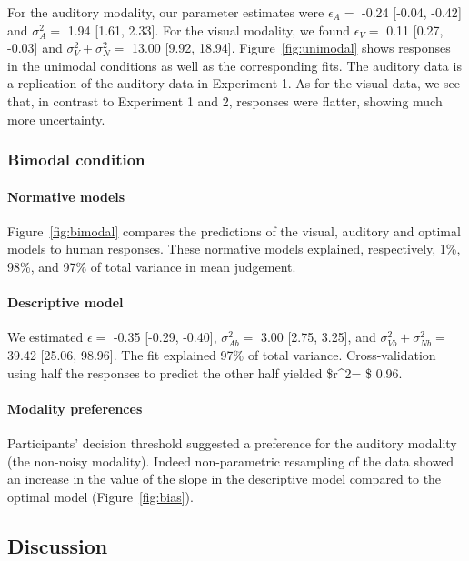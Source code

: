\documentclass[english,man]{apa6}
\theoremstyle{definition}
\theoremstyle{definition}
\theoremstyle{definition}
\theoremstyle{remark}
\begin{document}
For the auditory modality, our parameter estimates were \(\epsilon_A=\)
-0.24 {[}-0.04, -0.42{]} and \(\sigma^2_A=\) 1.94 {[}1.61, 2.33{]}. For
the visual modality, we found \(\epsilon_V=\) 0.11 {[}0.27, -0.03{]} and
\(\sigma^2_V+\sigma^2_N=\) 13.00 {[}9.92, 18.94{]}.
Figure~\ref{fig:unimodal} shows responses in the unimodal conditions as
well as the corresponding fits. The auditory data is a replication of
the auditory data in Experiment 1. As for the visual data, we see that,
in contrast to Experiment 1 and 2, responses were flatter, showing much
more uncertainty.

\subsubsection{Bimodal condition}\label{bimodal-condition-3}

\paragraph{Normative models}\label{normative-models-2}

Figure~\ref{fig:bimodal} compares the predictions of the visual,
auditory and optimal models to human responses. These normative models
explained, respectively, 1\%, 98\%, and 97\% of total variance in mean
judgement.

\paragraph{Descriptive model}\label{descriptive-model-3}

We estimated \(\epsilon=\) -0.35 {[}-0.29, -0.40{]}, \(\sigma^2_{Ab}=\)
3.00 {[}2.75, 3.25{]}, and \(\sigma^2_{Vb}+\sigma^2_{Nb}=\) 39.42
{[}25.06, 98.96{]}. The fit explained 97\% of total variance.
Cross-validation using half the responses to predict the other half
yielded \$r\^{}2= \$ 0.96.

\paragraph{Modality preferences}\label{modality-preferences-1}

Participants' decision threshold suggested a preference for the auditory
modality (the non-noisy modality). Indeed non-parametric resampling of
the data showed an increase in the value of the slope in the descriptive
model compared to the optimal model (Figure~\ref{fig:bias}).

\subsection{Discussion}\label{discussion-2}
\end{document}
